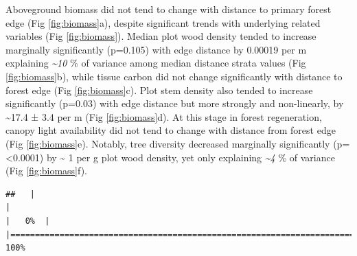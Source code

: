 \documentclass[
  12pt,
]{article}
\begin{document}
Aboveground biomass did not tend to change with distance to primary forest edge
(Fig \ref{fig:biomass}a), despite significant trends with underlying related variables
(Fig \ref{fig:biomass}).
Median plot wood density tended to increase marginally significantly
(p=0.105)
with edge distance by
0.00019 per m
explaining
\emph{\textasciitilde10} \% of variance
among median distance strata values
(Fig \ref{fig:biomass}b),
while tissue carbon did not change significantly with distance to forest edge
(Fig \ref{fig:biomass}c).
Plot stem density also tended to increase significantly
(p=0.03)
with edge distance but more strongly and non-linearly, by
\textasciitilde17.4 ±
3.4 per m
(Fig \ref{fig:biomass}d).
At this stage in forest regeneration, canopy light availability did not tend to change with distance from forest edge
(Fig \ref{fig:biomass}e).
Notably, tree diversity decreased marginally significantly
(p=\textless0.0001)
by
\textasciitilde{} 1
per g plot wood density,
yet only explaining
\emph{\textasciitilde4} \% of variance
(Fig \ref{fig:biomass}f).

\begin{verbatim}
##   |                                                                              |                                                                      |   0%  |                                                                              |======================================================================| 100%
\end{verbatim}
\end{document}
